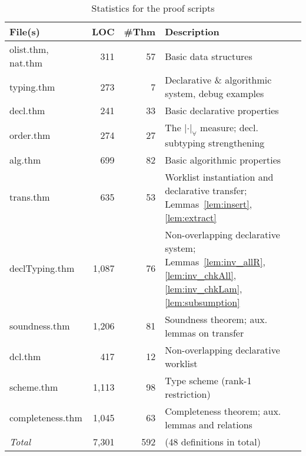 \begin{table}[t]
    \renewcommand{\arraystretch}{1.2}
    \caption{Statistics for the proof scripts}
    \centering\begin{tabular}{@{}lrrl@{}}
    \toprule
        File(s) & LOC & \#Thm & Description\\
    \midrule
        olist.thm, nat.thm  &   311 & 57  & Basic data structures\\
        typing.thm          &   273 & 7   & Declarative \& algorithmic system, debug examples\\
        decl.thm            &   241 & 33  & Basic declarative properties\\
        order.thm           &   274 & 27  & The $|\cdot|_\forall$ measure; decl. subtyping strengthening\\
        alg.thm             &   699 & 82  & Basic algorithmic properties\\
        trans.thm           &   635 & 53  & \makecell[l]{Worklist instantiation and declarative transfer;\\
                                Lemmas~\ref{lem:insert}, \ref{lem:extract}}\\
        declTyping.thm      & 1,087 & 76  & \makecell[l]{Non-overlapping declarative system; \\
                                Lemmas~\ref{lem:inv_allR}, \ref{lem:inv_chkAll},
                                    \ref{lem:inv_chkLam}, \ref{lem:subsumption}}\\
        soundness.thm       & 1,206 & 81  & Soundness theorem; aux. lemmas on transfer\\
        dcl.thm             &   417 & 12  & Non-overlapping declarative worklist \\
        scheme.thm          & 1,113 & 98  &
                                Type scheme (rank-1 restriction)\\
        completeness.thm    & 1,045 & 63  &
                                Completeness theorem; aux. lemmas and relations\\
    \midrule
        \emph{Total}        & 7,301 & 592 & (48 definitions in total)\\
    \bottomrule
    \end{tabular}
    \label{table:top:proof_statistics}
\end{table}



